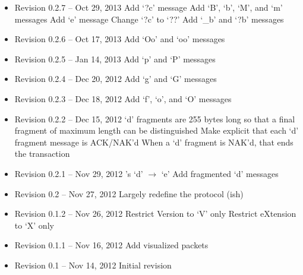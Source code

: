 \documentclass{article}
\begin{document}
\begin{itemize}

\item Revision 0.2.7 -- Oct 29, 2013
\subitem Add `?c' message
\subitem Add `B', `b', `M', and `m' messages
\subitem Add `e' message
\subitem Change `?c' to `??'
\subitem Add `\_b' and `?b' messages

\item Revision 0.2.6 -- Oct 17, 2013
\subitem Add `Oo' and `oo' messages

\item Revision 0.2.5 -- Jan 14, 2013
\subitem Add `p' and `P' messages

\item Revision 0.2.4 -- Dec 20, 2012
\subitem Add `g' and `G' messages

\item Revision 0.2.3 -- Dec 18, 2012
\subitem Add `f', `o', and `O' messages

\item Revision 0.2.2 -- Dec 15, 2012
\subitem `d' fragments are 255 bytes long so that a final fragment of maximum
length can be distinguished
\subitem Make explicit that each `d' fragment message is ACK/NAK'd
\subitem When a `d' fragment is NAK'd, that ends the transaction

\item Revision 0.2.1 -- Nov 29, 2012
's `d' $\rightarrow$ `e'
\subitem Add fragmented `d' messages

\item Revision 0.2 -- Nov 27, 2012
\subitem Largely redefine the protocol (ish)

\item Revision 0.1.2 -- Nov 26, 2012
\subitem Restrict Version to `V' only
\subitem Restrict eXtension to `X' only

\item Revision 0.1.1 -- Nov 16, 2012
\subitem Add visualized packets

\item Revision 0.1 -- Nov 14, 2012
\subitem Initial revision

\end{itemize}
\end{document}
